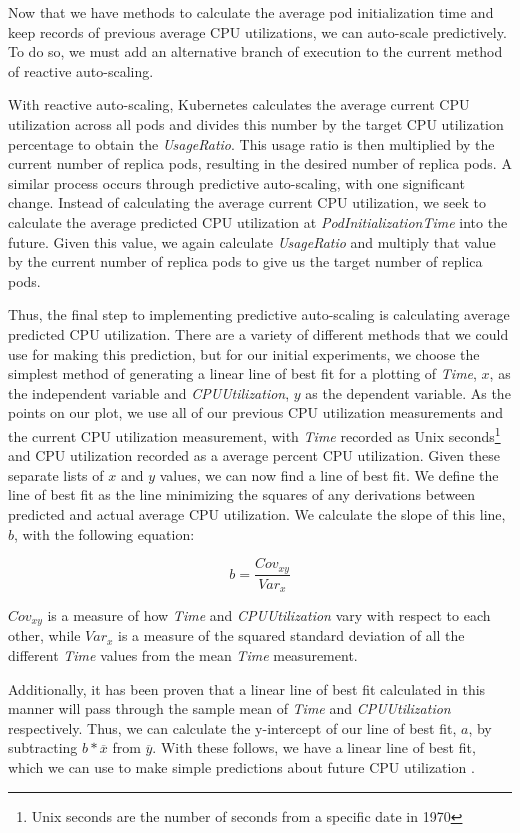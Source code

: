 Now that we have methods to calculate the average pod initialization time and
keep records of previous average CPU utilizations, we can auto-scale
predictively. To do so, we must add an alternative branch of execution to the
current method of reactive auto-scaling.

With reactive auto-scaling, Kubernetes calculates the average current CPU utilization
across all pods and divides this number by the target CPU utilization
percentage to obtain the \textit{UsageRatio}. This usage ratio is then multiplied
by the current number of replica pods, resulting in the desired number of
replica pods. A similar process occurs through predictive auto-scaling, with one
significant change. Instead of calculating the average current CPU utilization,
we seek to calculate the average predicted CPU utilization at
\textit{PodInitializationTime} into the future. Given this value, we again
calculate \textit{UsageRatio} and multiply that value by the current number of
replica pods to give us the target number of replica pods.

Thus, the final step to implementing predictive auto-scaling is calculating
average predicted CPU utilization. There are a variety of different methods that
we could use for making this prediction, but for our initial experiments, we
choose the simplest method of generating a linear line of best fit for a
plotting of \textit{Time}, $x$, as the independent variable and
\textit{CPUUtilization}, $y$ as the dependent variable. As the points on our plot, we
use all of our previous CPU utilization measurements and the current CPU
utilization measurement, with \textit{Time}
recorded as Unix seconds\footnote{Unix seconds are the number of seconds from a
specific date in 1970} and CPU utilization recorded as a average percent CPU
utilization. Given these separate lists of $x$ and $y$ values, we can now find a
line of best fit. We define the line of best fit as the line minimizing the
squares of any derivations between predicted and actual average CPU utilization.
We calculate the slope of this line, $b$, with the following equation:

\[ b = \frac{Cov_{xy}}{Var_{x}}\]

$Cov_{xy}$ is a measure of how \textit{Time} and \textit{CPUUtilization} vary
with respect to each other, while $Var_{{x}}$ is a measure of the squared standard
deviation of all the different \textit{Time} values from the mean \textit{Time}
measurement.

Additionally, it has been proven that a linear line of best fit calculated in
this manner will pass through the sample mean of \textit{Time} and
\textit{CPUUtilization} respectively. Thus, we can calculate the y-intercept of
our line of best fit, $a$, by subtracting $b * \overline{x}$ from $\overline{y}$. With
these follows, we have a linear line of best fit, which we can use to make
simple predictions about future CPU utilization \cite{line-of-best-fit}.

